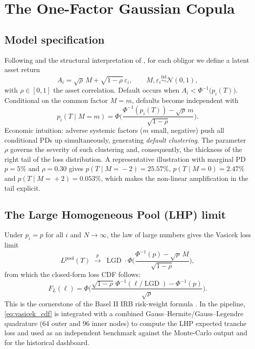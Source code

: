 \documentclass[11pt,a4paper]{article}
\newcommand{\1}{\mathbf{1}}
\newcommand{\Nor}{\mathcal{N}}
\DeclareMathOperator{\LGD}{LGD}
\begin{document}
\section{The One-Factor Gaussian Copula}\label{sec:copula}

\subsection{Model specification}
Following \citet{li2000} and the structural interpretation of
\citet{vasicek1987}, for each obligor we define a latent asset return
\begin{equation}
A_{i}=\sqrt{\rho}\,M+\sqrt{1-\rho}\,\varepsilon_{i},
\qquad M,\varepsilon_{i}\stackrel{\mathrm{iid}}{\sim}\Nor(0,1),
\label{eq:latent}
\end{equation}
with \(\rho\in[0,1]\) the asset correlation. Default occurs when
\(A_{i}<\Phi^{-1}\!\bigl(p_{i}(T)\bigr)\). Conditional on the common
factor \(M=m\), defaults become independent with
\begin{equation}
p_{i}(T\mid M=m)=\Phi\!\Biggl(\frac{\Phi^{-1}(p_{i}(T))-\sqrt{\rho}\,m}
{\sqrt{1-\rho}}\Biggr).
\label{eq:cond_pd}
\end{equation}
Economic intuition: adverse systemic factors (\(m\) small, negative)
push all conditional PDs up simultaneously, generating
\emph{default clustering}. The parameter \(\rho\) governs the severity
of such clustering and, consequently, the thickness of the right tail
of the loss distribution.  A representative illustration with
marginal PD \(p=5\%\) and \(\rho=0.30\) gives
\(p(T\mid M\!=\!-2)=25.57\%\),
\(p(T\mid M\!=\!0)=2.47\%\) and
\(p(T\mid M\!=\!+2)=0.053\%\), which makes the non-linear
amplification in the tail explicit.

\subsection{The Large Homogeneous Pool (LHP) limit}
Under \(p_{i}=p\) for all \(i\) and \(N\to\infty\), the law of large
numbers gives the Vasicek loss limit
\begin{equation}
L^{\text{pool}}(T)\;\xrightarrow{\;p\;}\;
\LGD\cdot\Phi\!\Biggl(\frac{\Phi^{-1}(p)-\sqrt{\rho}\,M}{\sqrt{1-\rho}}
\Biggr),
\end{equation}
from which the closed-form loss CDF follows:
\begin{equation}
F_{L}(\ell)
 =\Phi\!\Biggl(\frac{\sqrt{1-\rho}\,\Phi^{-1}(\ell/\LGD)-\Phi^{-1}(p)}
{\sqrt{\rho}}\Biggr).
\label{eq:vasicek_cdf}
\end{equation}
This is the cornerstone of the Basel II IRB risk-weight formula
\citep{vasicek1987,bcbs2006}.  In the pipeline, \eqref{eq:vasicek_cdf}
is integrated with a combined Gauss--Hermite/Gauss--Legendre quadrature
(64 outer and 96 inner nodes) to compute the LHP expected tranche loss
and used as an independent benchmark against the Monte-Carlo output
and for the historical dashboard.
\end{document}
